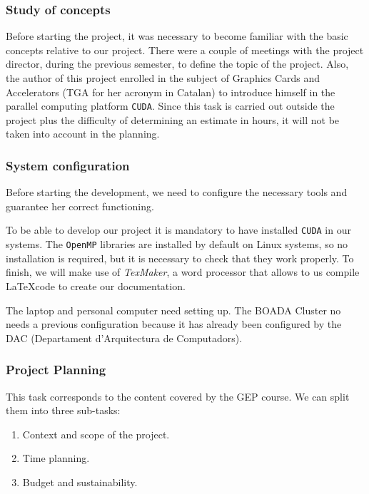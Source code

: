 \documentclass[titlepage,12pt]{report}
\begin{document}
\subsubsection{Study of concepts}

Before starting the project, it was necessary to become familiar with the basic concepts relative to our project. There were a couple of meetings with the project director, during the previous semester, to define the topic of the project. Also, the author of this project enrolled in the subject of Graphics Cards and Accelerators (TGA for her acronym in Catalan) to introduce himself in the parallel computing platform \texttt{CUDA}. Since this task is carried out outside the project plus the difficulty of determining an estimate in hours, it will not be taken into account in the planning.

\subsubsection{System configuration}

Before starting the development, we need to configure the necessary tools and guarantee her correct functioning.

To be able to develop our project it is mandatory to have installed \texttt{CUDA} in our systems. The \texttt{OpenMP} libraries are installed by default on Linux systems, so no installation is required, but it is necessary to check that they work properly. To finish, we will make use of \textit{TexMaker}, a word processor that allows to us compile \LaTeX code to create our documentation.

The laptop and personal computer need setting up. The BOADA Cluster no needs a previous configuration because it has already been configured by the DAC (Departament d'Arquitectura de Computadors).

\subsubsection{Project Planning}

This task corresponds to the content covered by the GEP course. We can split them into three sub-tasks:

\begin{enumerate}
		\item Context and scope of the project.
		\item Time planning.
		\item Budget and sustainability.
\end{enumerate}
\end{document}
